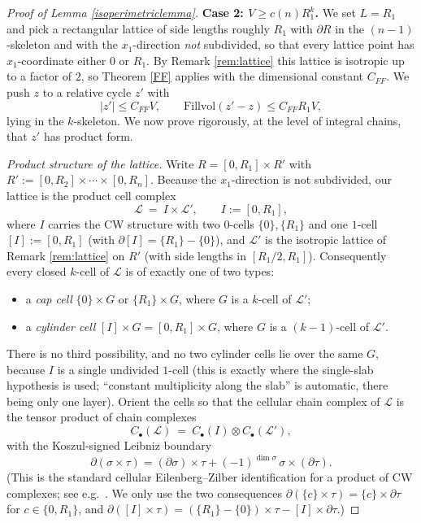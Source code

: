 \documentclass{amsart}
\newtheorem*{theorem 1}{Theorem 1}
\newtheorem*{theorem 2}{Theorem 2}
\newtheorem*{theorem 3}{Theorem 3}
\numberwithin{equation}{section}
\begin{document}
\begin{proof} [Proof of Lemma \ref{isoperimetriclemma}]
\medskip
\noindent\textbf{Case 2: $V \ge c(n) R_1^k$.}
We set $L = R_1$ and pick a rectangular lattice of side lengths
roughly $R_1$ with $\partial R$ in the $(n-1)$-skeleton and with the
$x_1$-direction \emph{not} subdivided, so that every lattice point
has $x_1$-coordinate either $0$ or $R_1$.  By
Remark \ref{rem:lattice} this lattice is isotropic up to a factor
of $2$, so Theorem \ref{FF} applies with the dimensional constant
$C_{FF}$.  We push $z$ to a relative cycle $z'$ with
$$ |z'| \le C_{FF} V, \qquad \mathrm{Fillvol}(z'-z) \le C_{FF} R_1 V, $$
lying in the $k$-skeleton.  We now prove rigorously, at the level
of integral chains, that $z'$ has product form.

\medskip
\noindent\emph{Product structure of the lattice.}
Write $R = [0,R_1] \times R'$ with $R' := [0,R_2] \times \cdots
\times [0,R_n]$.  Because the $x_1$-direction is not subdivided, our
lattice is the product cell complex
$$ \mathcal{L} \ =\ I \times \mathcal{L}', \qquad I := [0,R_1], $$
where $I$ carries the CW structure with two $0$-cells
$\{0\},\{R_1\}$ and one $1$-cell $[I] := [0,R_1]$ (with
$\partial[I] = \{R_1\} - \{0\}$), and $\mathcal{L}'$ is the
isotropic lattice of Remark \ref{rem:lattice} on $R'$ (with side
lengths in $[R_1/2,R_1]$).  Consequently every closed $k$-cell of
$\mathcal{L}$ is of exactly one of two types:
\begin{itemize}
\item[(a)] a \emph{cap cell} $\{0\}\times G$ or $\{R_1\}\times G$,
  where $G$ is a $k$-cell of $\mathcal{L}'$;
\item[(b)] a \emph{cylinder cell} $[I]\times G = [0,R_1]\times G$,
  where $G$ is a $(k-1)$-cell of $\mathcal{L}'$.
\end{itemize}
There is no third possibility, and no two cylinder cells lie over
the same $G$, because $I$ is a single undivided $1$-cell (this is
exactly where the single-slab hypothesis is used; ``constant
multiplicity along the slab'' is automatic, there being only one
layer).  Orient the cells so that the cellular chain complex of
$\mathcal{L}$ is the tensor product of chain complexes
$$ C_\bullet(\mathcal{L}) \ =\ C_\bullet(I)\otimes
   C_\bullet(\mathcal{L}'), $$
with the Koszul-signed Leibniz boundary
\begin{equation} \label{leibniz}
 \partial(\sigma \times \tau)
   = (\partial\sigma)\times \tau
     + (-1)^{\dim\sigma}\, \sigma\times(\partial\tau).
\end{equation}
(This is the standard cellular Eilenberg--Zilber identification for
a product of CW complexes; see e.g.\ \cite{G3}.  We only use the
two consequences $\partial(\{c\}\times\tau) = \{c\}\times
\partial\tau$ for $c\in\{0,R_1\}$, and
$\partial([I]\times\tau) = (\{R_1\}-\{0\})\times\tau
- [I]\times\partial\tau$.)


\end{proof}
\end{document}
